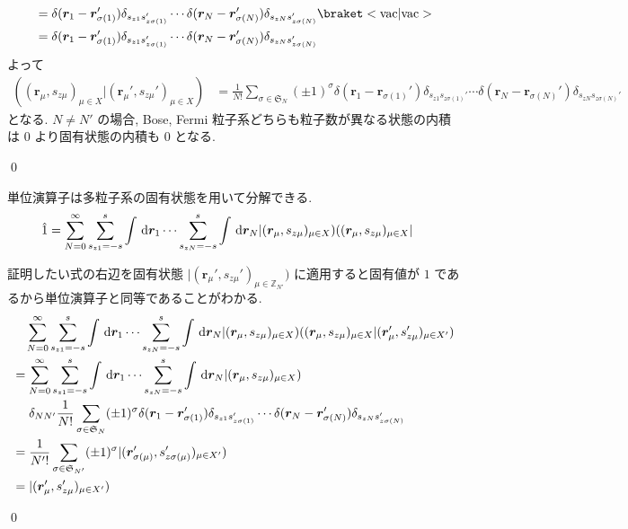 \documentclass[uplatex,dvipdfmx,a4paper,11pt]{jlreq}
\makeatletter
\newcommand{\ZZ}{\mathbb{Z}}
\renewcommand{\SS}{\mathfrak{S}}
\newcommand{\rr}{\bm{r}}
\numberwithin{equation}{section}
\theoremstyle{definition}
\renewenvironment{proof}[1][\proofname]{\par
  \normalfont
  \topsep6\p@\@plus6\p@ \trivlist
  \item[\hskip\labelsep{\bfseries #1}\@addpunct{\bfseries}]\ignorespaces\quad\par
}{
  \qed\endtrivlist\@endpefalse
}
\renewcommand\proofname{証明}
\makeatother
\begin{document}
\begin{proof}
\begin{align}
     & = \delta(\rr_1 - \rr_{\sigma(1)}')\delta_{s_{z1}s_{z\sigma(1)}'}\cdots\delta(\rr_N - \rr_{\sigma(N)}')\delta_{s_{zN}s_{z\sigma(N)}'}\braket<\mathrm{vac}|\mathrm{vac}>                                 \\
     & = \delta(\rr_1 - \rr_{\sigma(1)}')\delta_{s_{z1}s_{z\sigma(1)}'}\cdots\delta(\rr_N - \rr_{\sigma(N)}')\delta_{s_{zN}s_{z\sigma(N)}'}
  \end{align}
  よって
  \begin{align}
    ((\rr_{\mu}, s_{z\mu})_{\mu\in X}|(\rr_{\mu}', s_{z\mu}')_{\mu\in X}) & = \frac{1}{N!}\sum_{\sigma\in\SS_N}(\pm 1)^\sigma\delta(\rr_1 - \rr_{\sigma(1)}')\delta_{s_{z1}s_{z\sigma(1)}'}\cdots\delta(\rr_N - \rr_{\sigma(N)}')\delta_{s_{zN}s_{z\sigma(N)}'}
  \end{align}
  となる. $N \neq N'$ の場合, Bose, Fermi 粒子系どちらも粒子数が異なる状態の内積は 0 より固有状態の内積も 0 となる.
\end{proof}

\begin{theorem}[Q21-86(iii)]
  単位演算子は多粒子系の固有状態を用いて分解できる.
  \begin{align}
    \hat{1} & = \sum_{N = 0}^{\infty}\sum_{s_{z1} = -s}^{s}\int\dl{\rr_1}\cdots\sum_{s_{zN} = -s}^{s}\int\dl{\rr_N}|(\rr_\mu, s_{z\mu})_{\mu\in X})((\rr_\mu, s_{z\mu})_{\mu\in X}|
  \end{align}
\end{theorem}
\begin{proof}
  証明したい式の右辺を固有状態 $|(\rr_\mu', s_{z\mu}')_{\mu\in\ZZ_{N'}})$ に適用すると固有値が $1$ であるから単位演算子と同等であることがわかる.
  \begin{align}
     & \quad \sum_{N = 0}^{\infty}\sum_{s_{z1} = -s}^{s}\int\dl{\rr_1}\cdots\sum_{s_{zN} = -s}^{s}\int\dl{\rr_N}|(\rr_\mu, s_{z\mu})_{\mu\in X})((\rr_\mu, s_{z\mu})_{\mu\in X}|(\rr_\mu', s_{z\mu}')_{\mu\in X'}) \\
     & = \sum_{N = 0}^{\infty}\sum_{s_{z1} = -s}^{s}\int\dl{\rr_1}\cdots\sum_{s_{zN} = -s}^{s}\int\dl{\rr_N}|(\rr_\mu, s_{z\mu})_{\mu\in X})                                                                       \\
     & \quad\ \delta_{NN'}\frac{1}{N!}\sum_{\sigma\in\SS_N}(\pm 1)^\sigma\delta(\rr_1 - \rr_{\sigma(1)}')\delta_{s_{z1}s_{z\sigma(1)}'}\cdots\delta(\rr_N - \rr_{\sigma(N)}')\delta_{s_{zN}s_{z\sigma(N)}'}        \\
     & = \frac{1}{N'!}\sum_{\sigma\in\SS_{N'}}(\pm 1)^\sigma|(\rr_{\sigma(\mu)}', s_{z\sigma(\mu)}')_{\mu\in X'})                                                                                                  \\
     & = |(\rr_{\mu}', s_{z\mu}')_{\mu\in X'})
  \end{align}
\end{proof}
\end{document}
